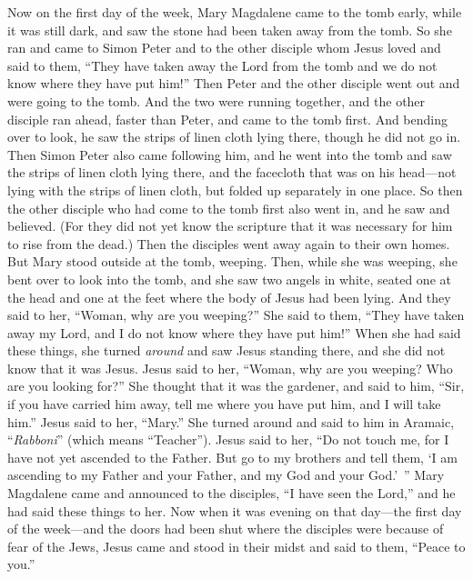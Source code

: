 \begin{biblechapter} %
 Now on the first day of the week, Mary Magdalene came to the tomb early, while it was still dark, and saw the stone had been taken away from the tomb.
\verse So she ran and came to Simon Peter and to the other disciple whom Jesus loved and said to them, “They have taken away the Lord from the tomb and we do not know where they have put him!”
\verse Then Peter and the other disciple went out and were going to the tomb.
\verse And the two were running together, and the other disciple ran ahead, faster than Peter, and came to the tomb first.
\verse And bending over to look, he saw the strips of linen cloth lying there, though he did not go in.
\verse Then Simon Peter also came following him, and he went into the tomb and saw the strips of linen cloth lying there,
\verse and the facecloth that was on his head—not lying with the strips of linen cloth, but folded up separately in one place.
\verse So then the other disciple who had come to the tomb first also went in, and he saw and believed.
\verse (For they did not yet know the scripture that it was necessary for him to rise from the dead.)
 Then the disciples went away again to their own homes.
\verse But Mary stood outside at the tomb, weeping. Then, while she was weeping, she bent over to look into the tomb,
\verse and she saw two angels in white, seated one at the head and one at the feet where the body of Jesus had been lying.
\verse And they said to her, “Woman, why are you weeping?” She said to them, “They have taken away my Lord, and I do not know where they have put him!”
\verse When she had said these things, she turned \textit{around} and saw Jesus standing there, and she did not know that it was Jesus.
\verse Jesus said to her, “Woman, why are you weeping? Who are you looking for?” She thought that it was the gardener, and said to him, “Sir, if you have carried him away, tell me where you have put him, and I will take him.”
\verse Jesus said to her, “Mary.” She turned around and said to him in Aramaic, “\textit{Rabboni}” (which means “Teacher”).
\verse Jesus said to her, “Do not touch me, for I have not yet ascended to the Father. But go to my brothers and tell them, ‘I am ascending to my Father and your Father, and my God and your God.’ ”
\verse Mary Magdalene came and announced to the disciples, “I have seen the Lord,” and he had said these things to her.
 Now when it was evening on that day—the first day of the week—and the doors had been shut where the disciples were because of fear of the Jews, Jesus came and stood in their midst and said to them, “Peace to you.”

\end{biblechapter}
